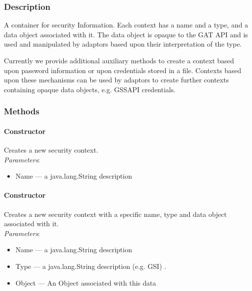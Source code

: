 \documentclass[$Date: 2003/06/26 19:29:31 $]{glabarticle}
\begin{document}

\subsubsection{Description}

A container for security Information.  Each context has a name and a
type, and a data object associated with it.  The data object is opaque
to the GAT API and is used and manipulated by adaptors based upon
their interpretation of the type.

Currently we provide additional auxiliary methods to create a context
based upon password information or upon credentials stored in a file.
Contexts based upon these mechanisms can be used by adaptors to create
further contexts containing opaque data objects, e.g. GSSAPI credentials.


\subsubsection{Methods}

\paragraph{Constructor}

Creates a new security context.\\

\textit{Parameters}:
\begin{itemize}
\item[] Name --- a java.lang.String description 
\end{itemize}

\paragraph{Constructor}

Creates a new security context with a specific name, type and data
object associated with it.\\

\textit{Parameters}:
\begin{itemize}
\item[] Name --- a java.lang.String description
\item[] Type --- a java.lang.String description (e.g. GSI) .
\item[] Object --- An Object associated with this data
\end{itemize}
\end{document}
